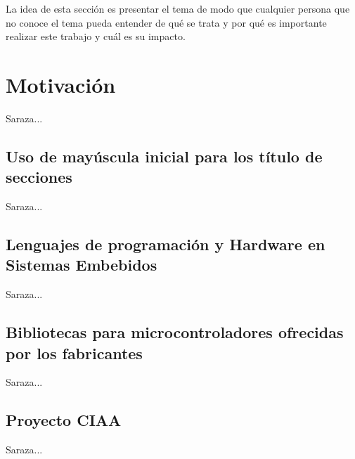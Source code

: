 La idea de esta sección es presentar el tema de modo que cualquier persona que no conoce el tema pueda entender de qué se trata y por qué es importante realizar este trabajo y cuál es su impacto.
\section{Motivación}
\label{sec:motivacion}

Saraza...

\subsection{Uso de mayúscula inicial para los título de secciones}

Saraza...

\subsection{Lenguajes de programación y Hardware en Sistemas Embebidos}

Saraza...

\subsection{Bibliotecas para microcontroladores ofrecidas por los fabricantes}

Saraza...

\subsection{Proyecto CIAA}

Saraza...
